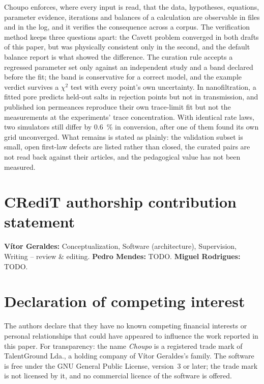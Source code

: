 \documentclass[preprint,12pt]{elsarticle}
\begin{document}
Choupo enforces, where every input is read, that the data, hypotheses,
equations, parameter evidence, iterations and balances of a calculation
are observable in files and in the log, and it verifies the consequence
across a corpus.  The verification method keeps three questions apart:
the Cavett problem converged in both drafts of this paper, but was
physically consistent only in the second, and the default balance report
is what showed the difference.  The curation rule accepts a regressed
parameter set only against an independent study and a band declared
before the fit; the band is conservative for a correct model, and the
example verdict survives a $\chi^2$ test with every point's own
uncertainty.  In nanofiltration, a fitted pore predicts held-out salts in
rejection points but not in transmission, and published ion permeances
reproduce their own trace-limit fit but not the measurements at the
experiments' trace concentration.  With identical rate laws, two
simulators still differ by 0.6~\% in conversion, after one of them found
its own grid unconverged.  What remains is stated as plainly: the
validation subset is small, open first-law defects are listed rather than
closed, the curated pairs are not read back against their articles, and
the pedagogical value has not been measured.

\section*{CRediT authorship contribution statement}

\textbf{Vítor Geraldes:} Conceptualization, Software (architecture),
Supervision, Writing -- review \& editing.
\textbf{Pedro Mendes:} TODO.
\textbf{Miguel Rodrigues:} TODO.

\section*{Declaration of competing interest}

The authors declare that they have no known competing financial interests
or personal relationships that could have appeared to influence the work
reported in this paper.  For transparency: the name \emph{Choupo} is a
registered trade mark of TalentGround Lda., a holding company of Vítor
Geraldes's family.  The software is free under the GNU General Public
License, version~3 or later; the trade mark is not licensed by it, and no
commercial licence of the software is offered.
\end{document}
